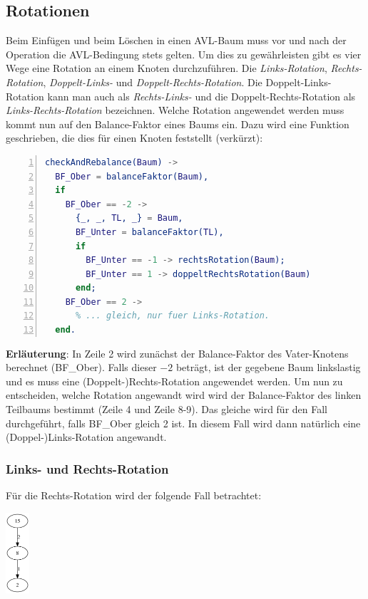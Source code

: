 \documentclass{article}
\begin{document}
	\subsection{Rotationen}
	
	Beim Einfügen und beim Löschen in einen AVL-Baum muss vor und nach der Operation die AVL-Bedingung stets gelten. Um dies zu gewährleisten gibt es vier Wege eine Rotation an einem Knoten durchzuführen. Die \textit{Links-Rotation}, \textit{Rechts-Rotation}, \textit{Doppelt-Links-} und \textit{Doppelt-Rechts-Rotation}. Die Doppelt-Links-Rotation kann man auch als \textit{Rechts-Links-} und die Doppelt-Rechts-Rotation als \textit{Links-Rechts-Rotation} bezeichnen. 
	Welche Rotation angewendet werden muss kommt nun auf den Balance-Faktor eines Baums ein. Dazu wird eine Funktion geschrieben, die dies für einen Knoten feststellt (verkürzt):
	
	\begin{lstlisting}[language=erlang,numbers=left]
checkAndRebalance(Baum) ->
  BF_Ober = balanceFaktor(Baum),
  if
    BF_Ober == -2 ->
	  {_, _, TL, _} = Baum,
	  BF_Unter = balanceFaktor(TL),
	  if
	    BF_Unter == -1 -> rechtsRotation(Baum);
	    BF_Unter == 1 -> doppeltRechtsRotation(Baum)
	  end;
	BF_Ober == 2 ->
	  % ... gleich, nur fuer Links-Rotation.
  end.	
	\end{lstlisting}

	\textbf{Erläuterung}: In Zeile 2 wird zunächst der Balance-Faktor des Vater-Knotens berechnet (BF\_Ober). Falls dieser $-2$ beträgt, ist der gegebene Baum linkslastig und es muss eine (Doppelt-)Rechts-Rotation angewendet werden. Um nun zu entscheiden, welche Rotation angewandt wird wird der Balance-Faktor des linken Teilbaums bestimmt (Zeile 4 und Zeile 8-9).
	Das gleiche wird für den Fall durchgeführt, falls BF\_Ober gleich 2 ist. In diesem Fall wird dann natürlich eine (Doppel-)Links-Rotation angewandt.
	
	\subsubsection{Links- und Rechts-Rotation}
	
	Für die Rechts-Rotation wird der folgende Fall betrachtet:
	
	\begin{center}
   	\includegraphics[height=3cm]{2.png}
	\end{center}
	
\end{document}
